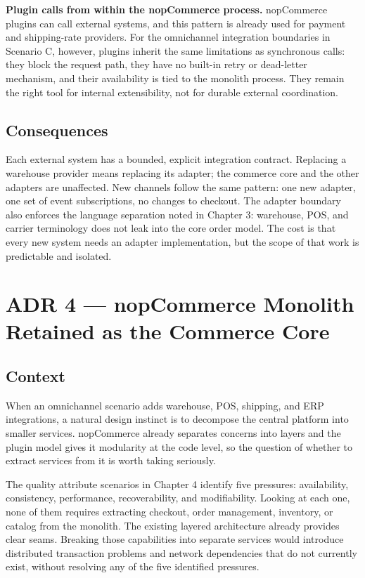 \textbf{Plugin calls from within the nopCommerce process.} nopCommerce plugins can call
external systems, and this pattern is already used for payment and shipping-rate providers.
For the omnichannel integration boundaries in Scenario C, however, plugins inherit the same
limitations as synchronous calls: they block the request path, they have no built-in retry or
dead-letter mechanism, and their availability is tied to the monolith process. They remain the
right tool for internal extensibility, not for durable external coordination.

\subsection{Consequences}

Each external system has a bounded, explicit integration contract. Replacing a warehouse
provider means replacing its adapter; the commerce core and the other adapters are unaffected.
New channels follow the same pattern: one new adapter, one set of event subscriptions, no
changes to checkout. The adapter boundary also enforces the language separation noted in
Chapter 3: warehouse, POS, and carrier terminology does not leak into the core order model.
The cost is that every new system needs an adapter implementation, but the scope of that work
is predictable and isolated.

\section{ADR 4 — nopCommerce Monolith Retained as the Commerce Core}

\subsection{Context}

When an omnichannel scenario adds warehouse, POS, shipping, and ERP integrations, a natural
design instinct is to decompose the central platform into smaller services. nopCommerce already
separates concerns into layers and the plugin model gives it modularity at the code level, so
the question of whether to extract services from it is worth taking seriously.

The quality attribute scenarios in Chapter 4 identify five pressures: availability,
consistency, performance, recoverability, and modifiability. Looking at each one, none of them
requires extracting checkout, order management, inventory, or catalog from the monolith. The
existing layered architecture already provides clear seams. Breaking those capabilities into
separate services would introduce distributed transaction problems and network dependencies that
do not currently exist, without resolving any of the five identified pressures.

